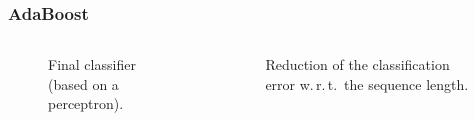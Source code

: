 \begin{frame}
  \frametitle{AdaBoost \cont}


  \begin{columns}[c, onlytextwidth]
    \begin{column}{0.5\textwidth}
      \begin{figure}
        \centering
        \caption{\footnotesize Final classifier (based on a perceptron).}
      \end{figure}
    \end{column}\begin{column}{0.5\textwidth}
      \begin{figure}
        \centering
        \caption{\footnotesize Reduction of the classification error w.\,r.\,t.\ the sequence length.}
      \end{figure}
  \end{column}
  \end{columns}
\end{frame}

